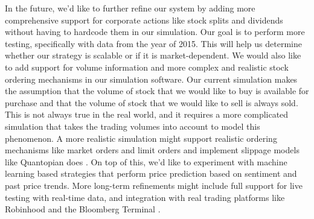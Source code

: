 In the future, we'd like to further refine our system by adding more comprehensive support for corporate actions like stock splits and dividends without having to hardcode them in our simulation.
Our goal is to perform more testing, specifically with data from the year of 2015.
This will help us determine whether our strategy is scalable or if it is market-dependent.
We would also like to add support for volume information and more complex and realistic stock ordering mechanisms in our simulation software.
Our current simulation makes the assumption that the volume of stock that we would like to buy is available for purchase and that the volume of stock that we would like to sell is always sold.
This is not always true in the real world, and it requires a more complicated simulation that takes the trading volumes into account to model this phenomenon.
A more realistic simulation might support realistic ordering mechanisms like market orders and limit orders and implement slippage models like Quantopian does \cite{quantopianSlippage}.
On top of this, we'd like to experiment with machine learning based strategies that perform price prediction based on sentiment and past price trends.
More long-term refinements might include full support for live testing with real-time data, and integration with real trading platforms like Robinhood \cite{robinhood} and the Bloomberg Terminal \cite{terminal}. 

